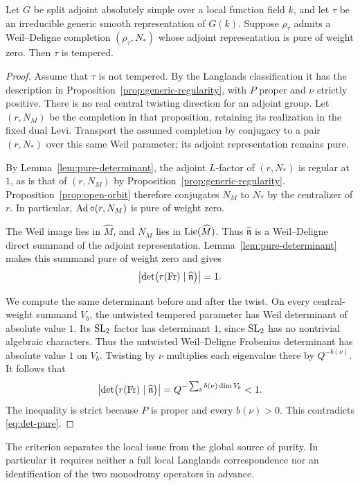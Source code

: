 \begin{theorem}\label{thm:local-criterion}
Let $G$ be split adjoint absolutely simple over a local function field
$k$, and let $\tau$ be an irreducible generic smooth representation of
$G(k)$. Suppose $\rho_\tau$ admits a Weil--Deligne completion
$(\rho_\tau,N_*)$ whose adjoint representation is pure of weight zero.
Then $\tau$ is tempered.
\end{theorem}

\begin{proof}
Assume that $\tau$ is not tempered. By the Langlands classification it
has the description in Proposition~\ref{prop:generic-regularity}, with
$P$ proper and $\nu$ strictly positive. There is no real central twisting
direction for an adjoint group. Let $(r,N_M)$ be the completion in that
proposition, retaining its realization in the fixed dual Levi.
Transport the assumed completion by conjugacy to a pair $(r,N_*)$
over this same Weil parameter; its adjoint representation remains pure.

By Lemma~\ref{lem:pure-determinant}, the adjoint $L$-factor of
$(r,N_*)$ is regular at $1$, as is that of $(r,N_M)$ by
Proposition~\ref{prop:generic-regularity}.
Proposition~\ref{prop:open-orbit} therefore conjugates $N_M$ to $N_*$
by the centralizer of $r$. In particular,
$\operatorname{Ad}\circ(r,N_M)$ is pure of weight zero.

The Weil image lies in $\widehat M$, and $N_M$ lies in
$\operatorname{Lie}(\widehat M)$. Thus $\widehat{\mathfrak n}$ is a
Weil--Deligne direct summand of the adjoint representation.
Lemma~\ref{lem:pure-determinant} makes this summand pure of weight
zero and gives
\begin{equation}\label{eq:det-pure}
 \left|\det\bigl(r(\operatorname{Fr})\mid\widehat{\mathfrak n}\bigr)\right|=1.
\end{equation}

We compute the same determinant before and after the twist. On every
central-weight summand $V_b$, the untwisted tempered parameter has
Weil determinant of absolute value $1$. Its $\mathrm{SL}_2$ factor has determinant
$1$, since $\mathrm{SL}_2$ has no nontrivial algebraic characters. Thus the
untwisted Weil--Deligne Frobenius determinant has absolute value $1$
on $V_b$. Twisting by $\nu$ multiplies each eigenvalue there by
$Q^{-b(\nu)}$. It follows that
\begin{equation}\label{eq:det-positive}
 \left|\det\bigl(r(\operatorname{Fr})\mid\widehat{\mathfrak n}\bigr)\right|
   =Q^{-\sum_b b(\nu)\dim V_b}<1.
\end{equation}
The inequality is strict because $P$ is proper and every $b(\nu)>0$.
This contradicts \eqref{eq:det-pure}.
\end{proof}

The criterion separates the local issue from the global source of purity.
In particular it requires neither a full local Langlands correspondence
nor an identification of the two monodromy operators in advance.
